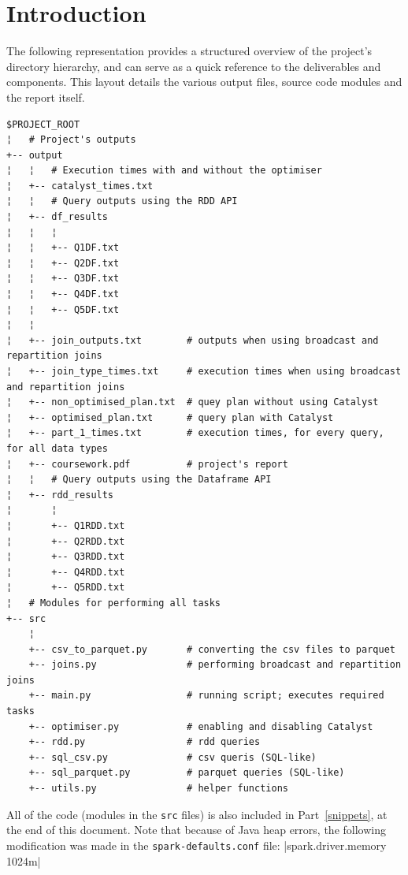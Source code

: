 \documentclass[12pt,twoside]{article}
\begin{document}



\section*{Introduction}

The following representation provides a structured overview of the project's directory hierarchy, and can serve as a quick reference to the deliverables and components. This layout details the various output files, source code modules and the report itself.

\begin{verbatim}
$PROJECT_ROOT
¦   # Project's outputs
+-- output
¦   ¦   # Execution times with and without the optimiser
¦   +-- catalyst_times.txt
¦   ¦   # Query outputs using the RDD API
¦   +-- df_results
¦   ¦   ¦
¦   ¦   +-- Q1DF.txt
¦   ¦   +-- Q2DF.txt
¦   ¦   +-- Q3DF.txt
¦   ¦   +-- Q4DF.txt
¦   ¦   +-- Q5DF.txt
¦   ¦
¦   +-- join_outputs.txt        # outputs when using broadcast and repartition joins
¦   +-- join_type_times.txt     # execution times when using broadcast and repartition joins
¦   +-- non_optimised_plan.txt  # quey plan without using Catalyst
¦   +-- optimised_plan.txt      # query plan with Catalyst
¦   +-- part_1_times.txt        # execution times, for every query, for all data types
¦   +-- coursework.pdf          # project's report
¦   ¦   # Query outputs using the Dataframe API
¦   +-- rdd_results
¦       ¦
¦       +-- Q1RDD.txt
¦       +-- Q2RDD.txt
¦       +-- Q3RDD.txt
¦       +-- Q4RDD.txt
¦       +-- Q5RDD.txt
¦   # Modules for performing all tasks
+-- src
    ¦
    +-- csv_to_parquet.py       # converting the csv files to parquet
    +-- joins.py                # performing broadcast and repartition joins
    +-- main.py                 # running script; executes required tasks
    +-- optimiser.py            # enabling and disabling Catalyst
    +-- rdd.py                  # rdd queries
    +-- sql_csv.py              # csv queris (SQL-like)
    +-- sql_parquet.py          # parquet queries (SQL-like)
    +-- utils.py                # helper functions
\end{verbatim}

All of the code (modules in the \texttt{src} files) is also included in Part~\ref{snippets}, at the end of this document. Note that because of Java heap errors, the following modification was made in the \texttt{spark-defaults.conf} file:
|spark.driver.memory 1024m|
\end{document}
